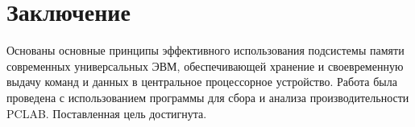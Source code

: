 \chapter*{Заключение}

Основаны основные принципы эффективного использования подсистемы памяти современных универсальных ЭВМ, обеспечивающей хранение
и своевременную выдачу команд и данных в центральное процессорное
устройство.
Работа была проведена с использованием программы для сбора и анализа производительности PCLAB.
Поставленная цель достигнута.


